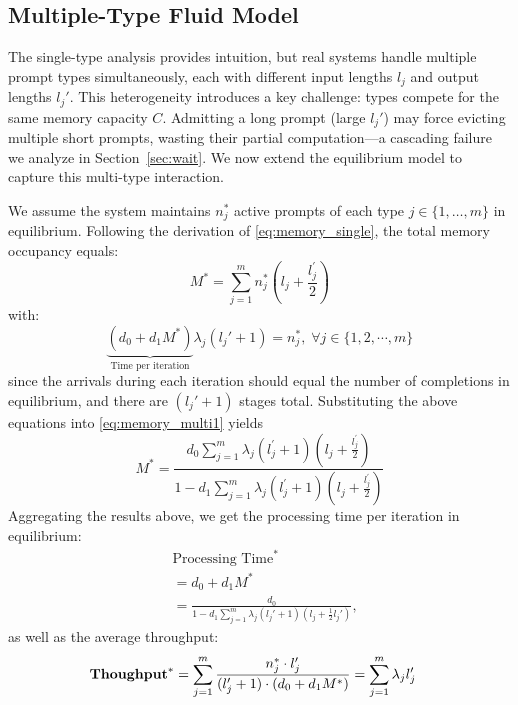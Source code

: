 \subsection{Multiple-Type Fluid Model}
The single-type analysis provides intuition, but real systems handle multiple prompt types simultaneously, each with different input lengths $l_j$ and output lengths $l_j'$. This heterogeneity introduces a key challenge: types compete for the same memory capacity $C$. Admitting a long prompt (large $l_j'$) may force evicting multiple short prompts, wasting their partial computation---a cascading failure we analyze in Section~\ref{sec:wait}. We now extend the equilibrium model to capture this multi-type interaction.

We assume the system maintains $n_j^*$ active prompts of each type $j \in \{1, \dots, m\}$ in equilibrium. Following the derivation of \eqref{eq:memory_single}, the total memory occupancy equals:
\begin{equation}
\label{eq:memory_multi1}
    M^* = \sum_{j=1}^m n_j^*\left(l_j + \frac{l_j^\prime}{2}\right)
\end{equation}
with:
$$ \underset{\text{Time per iteration}}{\underbrace{(d_0+d_1M^*)}}\lambda_j(l_j'+1) = n_j^*, \;\forall j \in \{1,2,\cdots,m\}$$
since the arrivals during each iteration should equal the number of completions in equilibrium, and there are $(l_j'+1)$ stages total. Substituting the above equations into \eqref{eq:memory_multi1} yields
\begin{equation}
\label{eq:memory_multi2}
M^* = \frac{d_0\sum_{j=1}^m \lambda_j (l_j^{\prime}+1)\left(l_j + \frac{l_j^{\prime}}{2} \right)}{1-d_1\sum_{j=1}^m \lambda_j (l_j^{\prime}+1)\left(l_j + \frac{l_j^{\prime}}{2} \right) } 
\end{equation}
Aggregating the results above, we get the processing time per iteration in equilibrium:
\begin{equation}    \label{eq:time_fluid}
    \begin{aligned}
            &\text{Processing Time}^* \\&= d_0 + d_1 M^*  \\
                  &= \frac{d_0}{1 - d_1 \sum_{j=1}^m \lambda_j (l_j' + 1)(l_j + \tfrac{1} {2}l_j')},
    \end{aligned}
\end{equation}
as well as the average throughput:
\begin{equation}
    \label{throughput_fluid_multiple}
    \begin{aligned}
        &\textbf{Thoughput}^*
        = \sum_{j=1}^m \frac{n_j^* \cdot l_j^{\prime}}{(l_j^{\prime}+1) \cdot (d_0 + d_1 M^*)}
        = \sum_{j=1}^m \lambda_j l_j^{\prime}
    \end{aligned}
\end{equation}
